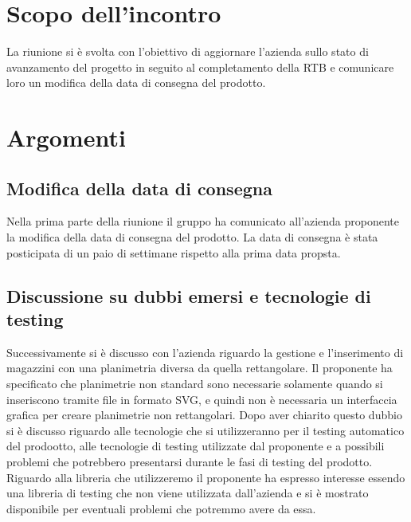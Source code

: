 \section{Scopo dell'incontro} \label{sec:scopo}
La riunione si è svolta con l'obiettivo di aggiornare l'azienda \nomeAzienda \space sullo stato di avanzamento del progetto in seguito al completamento della RTB 
e comunicare loro un modifica della data di consegna del prodotto.

\section{Argomenti} \label{sec:argomenti}
\subsection{Modifica della data di consegna}
Nella prima parte della riunione il gruppo ha comunicato all'azienda proponente la modifica della data di consegna del prodotto.
La data di consegna è stata posticipata di un paio di settimane rispetto alla prima data propsta.

\subsection{Discussione su dubbi emersi e tecnologie di testing}
Successivamente si è discusso con l'azienda riguardo la gestione e l'inserimento di magazzini con una planimetria diversa da 
quella rettangolare. Il proponente ha specificato che planimetrie non standard sono necessarie solamente quando si inseriscono tramite
file in formato SVG, e quindi non è necessaria un interfaccia grafica per creare planimetrie non rettangolari.
Dopo aver chiarito questo dubbio si è discusso riguardo alle tecnologie che si utilizzeranno per il testing automatico del prodootto, 
alle tecnologie di testing utilizzate dal proponente e a possibili problemi che potrebbero presentarsi durante le fasi di testing 
del prodotto. Riguardo alla libreria che utilizzeremo il proponente ha espresso interesse essendo una libreria di testing che non viene
utilizzata dall'azienda e si è mostrato disponibile per eventuali problemi che potremmo avere da essa.